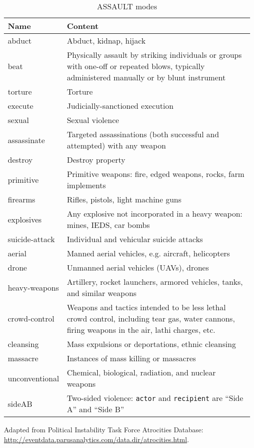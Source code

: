\documentclass[11pt]{report}
\newcommand{\txt}[1]{\texttt{#1}}
\begin{document}
\begin{table}[htp]
\caption{ASSAULT modes}
\begin{center}
\begin{tabular}{|p{}|p{}|}
\hline
Name & Content \\
\hline
abduct & Abduct, kidnap, hijack \\
beat & Physically assault by striking individuals or groups with one-off or repeated blows, typically administered manually or by blunt instrument\\
torture & Torture \\
execute & Judicially-sanctioned execution \\
sexual & Sexual violence\\
assassinate & Targeted assassinations (both successful and attempted) with any weapon \\
destroy & Destroy property \\
primitive & Primitive weapons: fire, edged weapons, rocks, farm implements \\
firearms & Rifles, pistols, light machine guns\\
explosives & Any explosive not incorporated in a heavy weapon: mines, IEDS, car bombs \\
suicide-attack & Individual and vehicular suicide attacks \\
aerial & Manned aerial vehicles, e.g. aircraft, helicopters \\
drone & Unmanned aerial vehicles (UAVs), drones \\
heavy-weapons & Artillery, rocket launchers, armored vehicles, tanks, and similar weapons \\
crowd-control & Weapons and tactics intended to be less lethal crowd control, including tear gas, water cannons, firing weapons in the air, lathi charges, etc. \\
cleansing & Mass expulsions or deportations, ethnic cleansing  \\
massacre & Instances of mass killing or massacres  \\
unconventional & Chemical, biological, radiation, and nuclear weapons  \\
sideAB & Two-sided violence: \txt{actor} and \txt{recipient} are ``Side A'' and ``Side B'' \\
\hline
\end{tabular}
\end{center}
\label{tab:violmode}
\raggedright{Adapted from Political Instability Task Force Atrocities Database: \url{http://eventdata.parusanalytics.com/data.dir/atrocities.html}}.
\end{table}%
\end{document}
